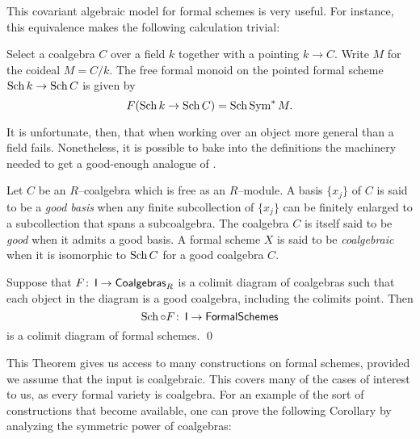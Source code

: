 This covariant algebraic model for formal schemes is very useful.    For instance, this equivalence makes the following calculation trivial:
\begin{lemma}
Select a coalgebra $C$ over a field $k$ together with a pointing $k \to C$.  Write $M$ for the coideal $M = C / k$.  The free formal monoid on the pointed formal scheme $\operatorname{Sch} k \to \operatorname{Sch} C$ is given by  \[F(\Sch k \to \Sch C) = \Sch \Sym^* M. \qed\]
\end{lemma}

It is unfortunate, then, that when working over an object more general than a field  fails.  Nonetheless, it is possible to bake into the definitions the machinery needed to get a good-enough analogue of .

\begin{definition}
Let $C$ be an $R$--coalgebra which is free as an $R$--module.  A basis $\{x_j\}$ of $C$ is said to be a \textit{good basis} when any finite subcollection of $\{x_j\}$ can be finitely enlarged to a subcollection that spans a subcoalgebra.  The coalgebra $C$ is itself said to be \textit{good} when it admits a good basis.  A formal scheme $X$ is said to be \textit{coalgebraic} when it is isomorphic to $\operatorname{Sch} C$ for a good coalgebra $C$.
\end{definition}

\begin{theorem}
Suppose that $F\colon\thinspace \mathsf{I} \to \mathsf{Coalgebras}_R$ is a colimit diagram of coalgebras such that each object in the diagram is a good coalgebra, including the colimits point.  Then \[\operatorname{Sch} \circ F\colon\thinspace \mathsf{I} \to \mathsf{FormalSchemes}\] is a colimit diagram of formal schemes. \qed
\end{theorem}

This Theorem gives us access to many constructions on formal schemes, provided we assume that the input is coalgebraic.  This covers many of the cases of interest to us, as every formal variety is coalgebra.  For an example of the sort of constructions that become available, one can prove the following Corollary by analyzing the symmetric power of coalgebras:

